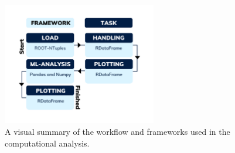 \begin{figure}
  \centering
  \includegraphics[width=0.6\textwidth]{Figures/Illustrations/TaskFlow.png}
  \vspace{-1cm}
  \caption{A visual summary of the workflow and frameworks used in the 
  computational analysis. }
  \label{fig:WF}
\end{figure}
